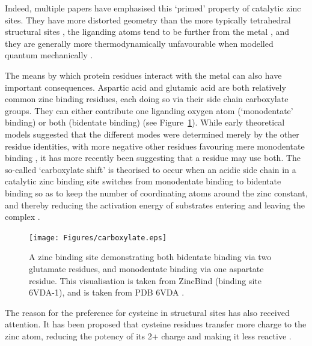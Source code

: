 Indeed, multiple papers have emphasised this `primed' property of catalytic zinc sites. They have more distorted geometry than the more typically tetrahedral structural sites \cite{roe1999zinc}, the liganding atoms tend to be further from the metal \cite{lee2008physical}, and they are generally more thermodynamically unfavourable when modelled quantum mechanically \cite{sousa2009zinc}.

The means by which protein residues interact with the metal can also have important consequences. Aspartic acid and glutamic acid are both relatively common zinc binding residues, each doing so via their side chain carboxylate groups. They can either contribute one liganding oxygen atom (`monodentate' binding) or both (bidentate binding) (see
Figure~\ref{fig:carboxylate}). While early theoretical models suggested that the different modes were determined merely by the other residue identities, with more negative other residues favouring mere monodentate binding \cite{ryde1999carboxylate}, it has more recently been suggesting that a residue may use both. The so-called `carboxylate shift' is theorised to occur when an acidic side chain in a catalytic zinc binding site switches from monodentate binding to bidentate binding so as to keep the number of coordinating atoms around the zinc constant, and thereby reducing the activation energy of substrates entering and leaving the complex \cite{sousa2007carboxylate}.

\begin{figure}
\centering
\texttt{[image: Figures/carboxylate.eps]}
\caption[Monodentate and bidentate binding]{\label{fig:carboxylate} A zinc binding site demonstrating both bidentate binding via two glutamate residues, and monodentate binding via one aspartate residue. This visualisation is taken from ZincBind (binding site 6VDA-1), and is taken from PDB 6VDA \cite{udagedara2020pdb}.}
\end{figure}


The reason for the preference for cysteine in structural sites has also received attention. It has been proposed that cysteine residues transfer more charge to the zinc atom, reducing the potency of its 2+ charge and making it less reactive \cite{lee2008physical}. 

